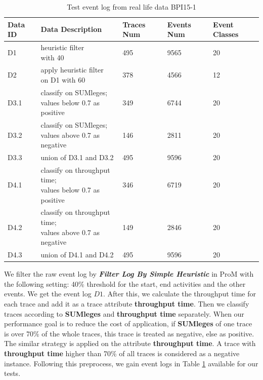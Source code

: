 \begin{table}[h]	
	\caption{Test event log from real life data BPI15-1}
	\label{tab:event-log}
	\begin{tabular}{|l|l|l|l|l|}
		\hline
		Data ID & Data Description                                & Traces Num & Events Num & Event Classes \\ \hline
		D1      & \makecell{heuristic filter  \\ with 40 }                     & 495        & 9565       & 20             \\ \hline
		D2      & \makecell{apply heuristic filter \\ on D1 with 60      }     & 378        & 4566       & 12            \\ \hline
		D3.1    & \makecell{classify on SUMleges;  \\ values below 0.7 as positive} & 349        & 6744       & 20             \\ \hline
		D3.2    & \makecell{classify on SUMleges;  \\ values above 0.7 as negative }& 146        & 2811       & 20             \\  \hline
		D3.3    & union of D3.1 and D3.2                             & 495        & 9596       & 20             \\ \hline
		D4.1    & \makecell{ classify on throughput time;  \\ values below 0.7 as positive} & 346        & 6719       & 20             \\ \hline
		D4.2    & \makecell{classify on throughput time;  \\ values above 0.7 as negative} & 149        & 2846       & 20            \\ \hline
		D4.3    & union of D4.1 and D4.2                             & 495        & 9596       & 20           \\ \hline
	\end{tabular}
\end{table}

We filter the raw event log by \textbf{\emph{Filter Log By Simple Heuristic}} in ProM with the following setting: 40\% threshold for the start, end  activities and the other events. We get the event log $D1$. After this, we calculate the throughput time for each trace and add it as a trace attribute \textbf{throughput time}. 
Then we classify traces according to  \textbf{SUMleges} and  \textbf{throughput time} separately. When our performance goal is to reduce the cost of application, if \textbf{SUMleges} of one trace is over 70\% of the whole traces, this trace is treated as negative, else as positive. The similar strategy is applied on the attribute \textbf{throughput time}. A trace with \textbf{throughput time} higher than 70\% of all traces is considered as a negative instance. Following this preprocess, we gain event logs in Table \ref{tab:event-log} available for our tests. 


